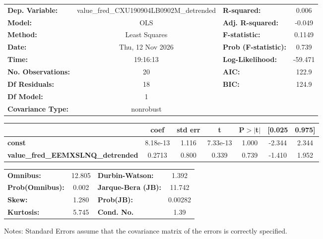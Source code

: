 \begin{center}
\begin{tabular}{lclc}
\toprule
\textbf{Dep. Variable:}                   & value\_fred\_CXU190904LB0902M\_detrended & \textbf{  R-squared:         } &     0.006   \\
\textbf{Model:}                           &                   OLS                    & \textbf{  Adj. R-squared:    } &    -0.049   \\
\textbf{Method:}                          &              Least Squares               & \textbf{  F-statistic:       } &    0.1149   \\
\textbf{Date:}                            &             Thu, 12 Nov 2026             & \textbf{  Prob (F-statistic):} &    0.739    \\
\textbf{Time:}                            &                 19:16:13                 & \textbf{  Log-Likelihood:    } &   -59.471   \\
\textbf{No. Observations:}                &                      20                  & \textbf{  AIC:               } &     122.9   \\
\textbf{Df Residuals:}                    &                      18                  & \textbf{  BIC:               } &     124.9   \\
\textbf{Df Model:}                        &                       1                  & \textbf{                     } &             \\
\textbf{Covariance Type:}                 &                nonrobust                 & \textbf{                     } &             \\
\bottomrule
\end{tabular}
\begin{tabular}{lcccccc}
                                          & \textbf{coef} & \textbf{std err} & \textbf{t} & \textbf{P$> |$t$|$} & \textbf{[0.025} & \textbf{0.975]}  \\
\midrule
\textbf{const}                            &     8.18e-13  &        1.116     &  7.33e-13  &         1.000        &       -2.344    &        2.344     \\
\textbf{value\_fred\_EEMXSLNQ\_detrended} &       0.2713  &        0.800     &     0.339  &         0.739        &       -1.410    &        1.952     \\
\bottomrule
\end{tabular}
\begin{tabular}{lclc}
\textbf{Omnibus:}       & 12.805 & \textbf{  Durbin-Watson:     } &    1.392  \\
\textbf{Prob(Omnibus):} &  0.002 & \textbf{  Jarque-Bera (JB):  } &   11.742  \\
\textbf{Skew:}          &  1.280 & \textbf{  Prob(JB):          } &  0.00282  \\
\textbf{Kurtosis:}      &  5.745 & \textbf{  Cond. No.          } &     1.39  \\
\bottomrule
\end{tabular}
\end{center}

Notes: \newline
 [1] Standard Errors assume that the covariance matrix of the errors is correctly specified.